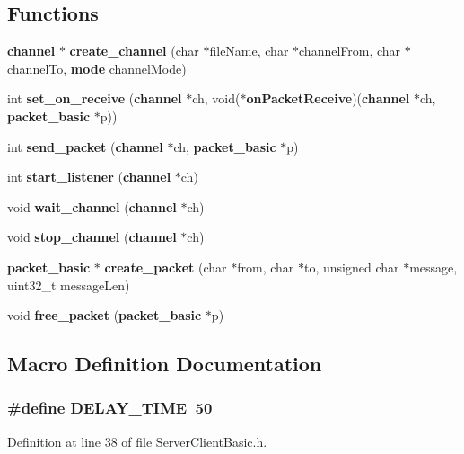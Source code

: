 \subsection*{Functions}
\begin{DoxyCompactItemize}
\item 
{\bf channel} $\ast$ {\bf create\+\_\+channel} (char $\ast$file\+Name, char $\ast$channel\+From, char $\ast$channel\+To, {\bf mode} channel\+Mode)
\item 
int {\bf set\+\_\+on\+\_\+receive} ({\bf channel} $\ast$ch, void($\ast${\bf on\+Packet\+Receive})({\bf channel} $\ast$ch, {\bf packet\+\_\+basic} $\ast$p))
\item 
int {\bf send\+\_\+packet} ({\bf channel} $\ast$ch, {\bf packet\+\_\+basic} $\ast$p)
\item 
int {\bf start\+\_\+listener} ({\bf channel} $\ast$ch)
\item 
void {\bf wait\+\_\+channel} ({\bf channel} $\ast$ch)
\item 
void {\bf stop\+\_\+channel} ({\bf channel} $\ast$ch)
\item 
{\bf packet\+\_\+basic} $\ast$ {\bf create\+\_\+packet} (char $\ast$from, char $\ast$to, unsigned char $\ast$message, uint32\+\_\+t message\+Len)
\item 
void {\bf free\+\_\+packet} ({\bf packet\+\_\+basic} $\ast$p)
\end{DoxyCompactItemize}


\subsection{Macro Definition Documentation}
\subsubsection[{D\+E\+L\+A\+Y\+\_\+\+T\+I\+ME}]{\setlength{\rightskip}{0pt plus 5cm}\#define D\+E\+L\+A\+Y\+\_\+\+T\+I\+ME~50}\label{_server_client_basic_8h_a898f8c58e7f9295dcd48d081926f82ca}


Definition at line 38 of file Server\+Client\+Basic.\+h.

